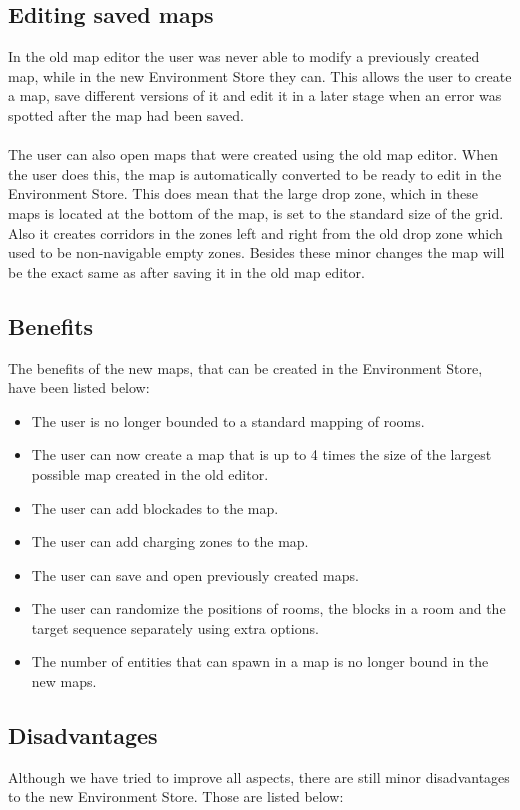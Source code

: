 \subsection{Editing saved maps}
In the old map editor the user was never able to modify a previously created map, while in the new Environment Store they can.
This allows the user to create a map, save different versions of it and edit it in a later stage when an error was spotted after the map had been saved.
\\
\\
The user can also open maps that were created using the old map editor. When the user does this, the map is automatically converted to be ready to edit in the Environment Store. This does mean that the large drop zone, which in these maps is located at the bottom of the map, is set
to the standard size of the grid. Also it creates corridors in the zones left and right from the old drop zone which used to be non-navigable empty zones.
Besides these minor changes the map will be the exact same as after saving it in the old map editor.

\subsection{Benefits}
The benefits of the new maps, that can be created in the Environment Store, have been listed below:

\begin{itemize}
	\item The user is no longer bounded to a standard mapping of rooms.
	\item The user can now create a map that is up to 4 times the size of the largest possible map created in the old editor.
	\item The user can add blockades to the map.
	\item The user can add charging zones to the map.
	\item The user can save and open previously created maps.
	\item The user can randomize the positions of rooms, the blocks in a room and the target sequence separately using extra options.
	\item The number of entities that can spawn in a map is no longer bound in the new maps.
\end{itemize}


\subsection{Disadvantages}
Although we have tried to improve all aspects, there are still minor disadvantages to the new Environment Store. Those are listed below:

